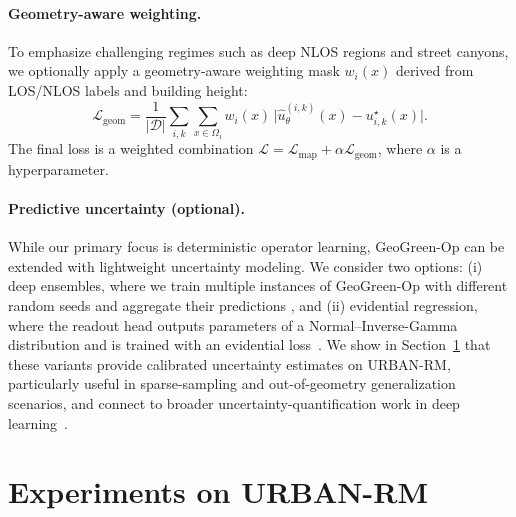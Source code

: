 \documentclass{article}
\begin{document}
\vspace{0.3em}
\paragraph{Geometry-aware weighting.}
To emphasize challenging regimes such as deep NLOS regions and
street canyons, we optionally apply a geometry-aware weighting mask
$w_i(x)$ derived from LOS/NLOS labels and building height:
\begin{equation}
\mathcal{L}_{\text{geom}}
= \frac{1}{|\mathcal{D}|}
  \sum_{i, k} \sum_{x \in \Omega_i}
    w_i(x)\,
    \big\lvert \hat{u}_\theta^{(i, k)}(x) - u^{\star}_{i, k}(x) \big\rvert.
\end{equation}
The final loss is a weighted combination
$\mathcal{L} = \mathcal{L}_{\text{map}} + \alpha \mathcal{L}_{\text{geom}}$,
where $\alpha$ is a hyperparameter.

\vspace{0.3em}
\paragraph{Predictive uncertainty (optional).}
While our primary focus is deterministic operator learning,
GeoGreen-Op can be extended with lightweight uncertainty modeling.
We consider two options:
(i) deep ensembles, where we train multiple instances of GeoGreen-Op with
different random seeds and aggregate their predictions
\cite{lakshminarayanan2017simple},
and (ii) evidential regression, where the readout head
outputs parameters of a Normal–Inverse-Gamma distribution and
is trained with an evidential loss~\cite{amini2020deep}.
We show in Section~\ref{sec:experiments}
that these variants provide calibrated uncertainty estimates
on URBAN-RM, particularly useful in sparse-sampling and
out-of-geometry generalization scenarios, and connect to broader
uncertainty-quantification work in deep learning~\cite{abdar2021review}.






\section{Experiments on URBAN-RM}
\label{sec:experiments}
\end{document}
